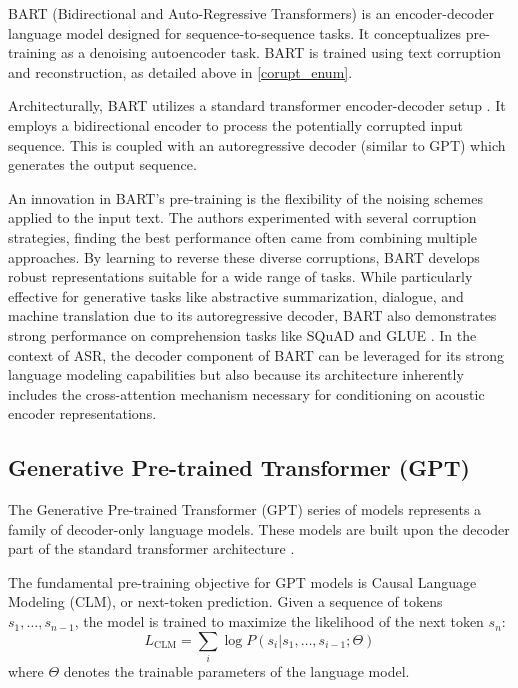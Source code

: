 BART (Bidirectional and Auto-Regressive Transformers) \cite{lewis2019bartdenoisingsequencetosequencepretraining} is an encoder-decoder language model designed for sequence-to-sequence tasks. It conceptualizes pre-training as a denoising autoencoder task. BART is trained using text corruption and reconstruction, as detailed above in \ref{corupt_enum}.

Architecturally, BART utilizes a standard transformer encoder-decoder setup \cite{vaswani2017attention}. It employs a bidirectional encoder to process the potentially corrupted input sequence. This is coupled with an autoregressive decoder (similar to GPT) which generates the output sequence.

An innovation in BART's pre-training is the flexibility of the noising schemes applied to the input text. The authors experimented with several corruption strategies, finding the best performance often came from combining multiple approaches. 
By learning to reverse these diverse corruptions, BART develops robust representations suitable for a wide range of tasks. While particularly effective for generative tasks like abstractive summarization, dialogue, and machine translation due to its autoregressive decoder, BART also demonstrates strong performance on comprehension tasks like SQuAD and GLUE \cite{lewis2019bartdenoisingsequencetosequencepretraining}. In the context of ASR, the decoder component of BART can be leveraged for its strong language modeling capabilities but also because its architecture inherently includes the cross-attention mechanism necessary for conditioning on acoustic encoder representations.

\subsection{Generative Pre-trained Transformer (GPT)}
\label{subsec:gpt}

The Generative Pre-trained Transformer (GPT) series of models represents a family of decoder-only language models. These models are built upon the decoder part of the standard transformer architecture \cite{vaswani2017attention}.

The fundamental pre-training objective for GPT models is Causal Language Modeling (CLM), or next-token prediction. Given a sequence of tokens \(s_1, \dots, s_{n-1}\), the model is trained to maximize the likelihood of the next token \(s_n\):
\begin{equation}
    L_{\text{CLM}} = \sum_i \log P(s_i | s_1, \dots, s_{i-1}; \Theta)
\end{equation}
where \(\Theta\) denotes the trainable parameters of the language model.

